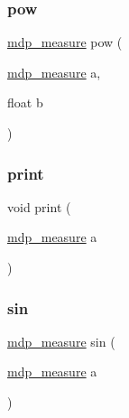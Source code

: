 \mbox{\label{classmdp__measure_adcca585e0856bb912b8069aaf56f9d95}} 
\subsubsection{\texorpdfstring{pow}{pow}}
{\footnotesize\ttfamily \hyperlink{classmdp__measure}{mdp\+\_\+measure} pow (\begin{DoxyParamCaption}\item[{\hyperlink{classmdp__measure}{mdp\+\_\+measure}}]{a,  }\item[{float}]{b }\end{DoxyParamCaption})\hspace{0.3cm}{\ttfamily [friend]}}

\mbox{\label{classmdp__measure_a2974468f862cb8c3fe0a0034a4bd2e08}} 
\subsubsection{\texorpdfstring{print}{print}}
{\footnotesize\ttfamily void print (\begin{DoxyParamCaption}\item[{\hyperlink{classmdp__measure}{mdp\+\_\+measure}}]{a }\end{DoxyParamCaption})\hspace{0.3cm}{\ttfamily [friend]}}

\mbox{\label{classmdp__measure_a7889df6f1c1f8cfd6cb9aa0a3f9a2ec9}} 
\subsubsection{\texorpdfstring{sin}{sin}}
{\footnotesize\ttfamily \hyperlink{classmdp__measure}{mdp\+\_\+measure} sin (\begin{DoxyParamCaption}\item[{\hyperlink{classmdp__measure}{mdp\+\_\+measure}}]{a }\end{DoxyParamCaption})\hspace{0.3cm}{\ttfamily [friend]}}



